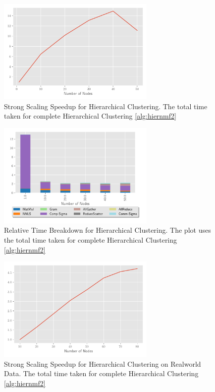\documentclass[conference,compsoc]{IEEEtran}
\begin{document}
\begin{figure}
\begin{center}
\includegraphics[height=2in, width=\columnwidth]{plots/synthetic_hierarchical_speedup.pdf}
\caption{Strong Scaling Speedup for Hierarchical Clustering. The total time taken for complete Hierarchical Clustering \cref{alg:hiernmf2}}
\label{fig:synhierspeedup}
\end{center}
\end{figure}

\begin{figure}
\begin{center}
\includegraphics[height=2in, width=\columnwidth]{plots/synthetic_hier_strongscaling.pdf}
\caption{Relative Time Breakdown for Hierarchical Clustering. The plot uses the total time taken for complete Hierarchical Clustering \cref{alg:hiernmf2}}
\label{fig:synhierstrongscaling}
\end{center}
\end{figure}

\begin{figure}
\begin{center}
\includegraphics[height=2in, width=\columnwidth]{plots/realworld_hierarchical_speedup.pdf}
\caption{Strong Scaling Speedup for Hierarchical Clustering on Realworld Data. The total time taken for complete Hierarchical Clustering \cref{alg:hiernmf2}}
\label{fig:rwhierspeedup}
\end{center}
\end{figure}
\end{document}
